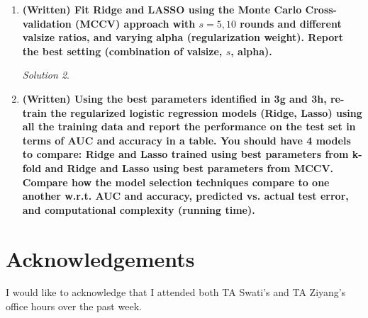 \documentclass[a4paper,12pt]{article}
\theoremstyle{definition}
\theoremstyle{remark}
\newtheorem*{solution}{Solution}
\begin{document}
\begin{enumerate}
\begin{enumerate}
\begin{solution}
			\end{solution}
			\item {\bf (Written) Fit Ridge and LASSO using the Monte Carlo Cross-validation (MCCV) approach with $s = 5, 10$ rounds and different valsize ratios, and varying alpha (regularization weight). Report the best setting (combination of valsize, $s$, alpha).}
			\begin{solution}
				
			\end{solution}
			\item {\bf (Written) Using the best parameters identified in 3g and 3h, re-train the regularized logistic regression models (Ridge, Lasso) using all the training data and report the performance on the test set in terms of AUC and accuracy in a table. You should have 4 models to compare: Ridge and Lasso trained using best parameters from k-fold and Ridge and Lasso using best parameters from MCCV. Compare how the model selection techniques compare to one another w.r.t. AUC and accuracy, predicted vs. actual test error, and computational complexity (running time).}
		\end{enumerate}
		
	\end{enumerate}
	
	
	
	
	\section*{Acknowledgements}
	I would like to acknowledge that I attended both TA Swati's and TA Ziyang's office hours over the past week.
	
\end{document}
